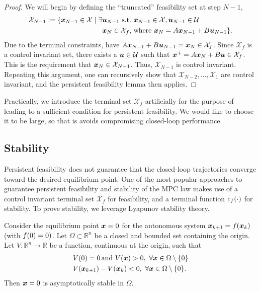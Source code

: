 \begin{proof}
We will begin by defining the ``truncated'' feasibility set at step $N-1$,
\begin{align}
    \mathcal{X}_{N-1} \vcentcolon= \{\bm{x}_{N-1} \in \mathcal{X} \mid \exists & \bm{u}_{N-1} \,\,\text{s.t.}\,\, \bm{x}_{N-1} \in \mathcal{X}, \bm{u}_{N-1} \in \mathcal{U}\\
    & \bm{x}_N \in \mathcal{X}_f, \,\text{where}\,\, \bm{x}_N = A \bm{x}_{N-1} + B \bm{u}_{N-1} \nonumber
    \}.
\end{align}
Due to the terminal constraints, have $A \bm{x}_{N-1} + B \bm{u}_{N-1} = \bm{x}_N \in \mathcal{X}_f$. Since $\mathcal{X}_f$ is a control invariant set, there exists a $\bm{u} \in \mathcal{U}$ such that $\bm{x}^+ = A \bm{x}_N + B \bm{u} \in \mathcal{X}_f$. This is the requirement that $\bm{x}_N \in \mathcal{X}_{N-1}$. Thus, $\mathcal{X}_{N-1}$ is control invariant. Repeating this argument, one can recursively show that $\mathcal{X}_{N-2}, \ldots, \mathcal{X}_1$ are control invariant, and the persistent feasibility lemma then applies. 
\end{proof}

Practically, we introduce the terminal set $\mathcal{X}_f$ artificially for the purpose of leading to a sufficient condition for persistent feasibility. We would like to choose it to be large, so that is avoids compromising closed-loop performance. 

\subsection{Stability}

Persistent feasibility does not guarantee that the closed-loop trajectories converge toward the desired equilibrium point. One of the most popular approaches to guarantee persistent feasibility and stability of the MPC law makes use of a control invariant terminal set $\mathcal{X}_f$ for feasibility, and a terminal function $c_f(\cdot)$ for stability. To prove stability, we leverage Lyapunov stability theory. 

\begin{theorem}
\label{thm:mpc_stability}
Consider the equilibrium point $\bm{x} = 0$ for the autonomous system $\bm{x}_{k+1} = f(\bm{x}_k)$ (with $f(0)=0)$. Let $\Omega \subset \mathbb{R}^n$ be a closed and bounded set containing the origin. Let $V:\mathbb{R}^n \to \mathbb{R}$ be a function, continuous at the origin, such that 
\begin{align}
    & V(0) = 0\, \text{and} \,\,V(\bm{x}) > 0, \,\, \forall \bm{x} \in \Omega \setminus \{0\} \\
    & V(\bm{x}_{k+1}) - V(\bm{x}_k) < 0, \,\, \forall \bm{x} \in \Omega \setminus \{0\}.
\end{align}
Then $\bm{x}=0$ is asymptotically stable in $\Omega$.
\end{theorem}

